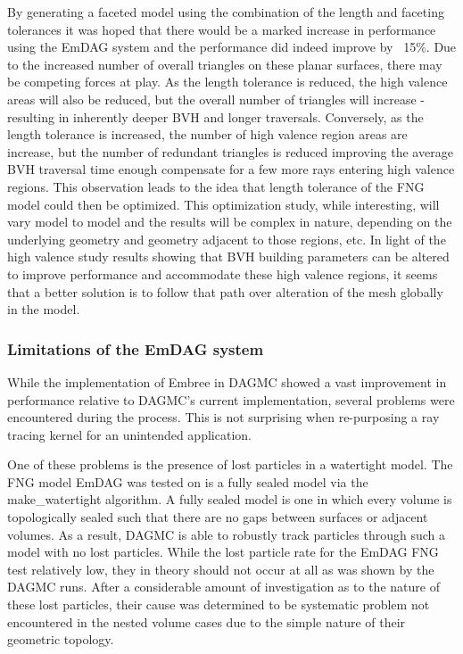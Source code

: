 By generating a faceted model using the combination of the length and faceting
tolerances it was hoped that there would be a marked increase in performance
using the EmDAG system and the performance did indeed improve by ~15\%. Due to
the increased number of overall triangles on these planar surfaces, there may be
competing forces at play. As the length tolerance is reduced, the high valence
areas will also be reduced, but the overall number of triangles will increase -
resulting in inherently deeper BVH and longer traversals. Conversely, as the
length tolerance is increased, the number of high valence region areas are
increase, but the number of redundant triangles is reduced improving the average
BVH traversal time enough compensate for a few more rays entering high valence
regions. This observation leads to the idea that length tolerance of the FNG
model could then be optimized. This optimization study, while interesting, will
vary model to model and the results will be complex in nature, depending on the
underlying geometry and geometry adjacent to those regions, etc. In light of the
high valence study results showing that BVH building parameters can be altered
to improve performance and accommodate these high valence regions, it seems that
a better solution is to follow that path over alteration of the mesh globally in
the model. 

\subsubsection{Limitations of the EmDAG system}\label{sec:emdag_limitations}

While the implementation of Embree in DAGMC showed a vast improvement in
performance relative to DAGMC's current implementation, several problems were
encountered during the process. This is not surprising when re-purposing a ray
tracing kernel for an unintended application.

One of these problems is the presence of lost particles in a watertight
model. The FNG model EmDAG was tested on is a fully sealed model via the
make\_watertight algorithm. A fully sealed model is one in which every volume is
topologically sealed such that there are no gaps between surfaces or adjacent
volumes. As a result, DAGMC is able to robustly track particles through such a
model with no lost particles. While the lost particle rate for the EmDAG FNG
test relatively low, they in theory should not occur at all as was shown by the
DAGMC runs. After a considerable amount of investigation as to the nature of
these lost particles, their cause was determined to be systematic problem not
encountered in the nested volume cases due to the simple nature of their
geometric topology.

